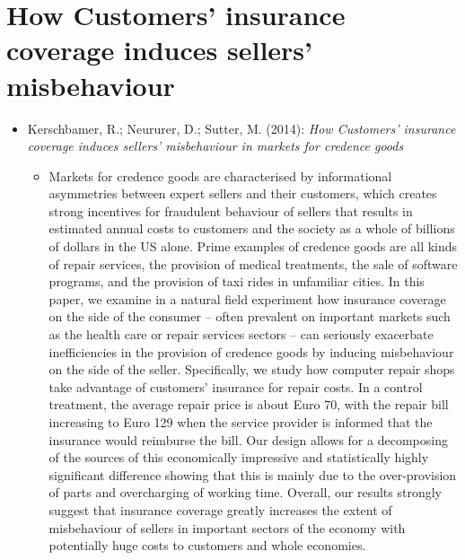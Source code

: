 \section{How Customers' insurance coverage induces sellers' misbehaviour}
\begin{itemize}	
	\item Kerschbamer, R.; Neururer, D.; Sutter, M. (2014): \textit{How Customers' insurance coverage induces sellers' misbehaviour in markets for credence goods}
		\begin{itemize}
			\item Markets for credence goods are characterised by informational asymmetries between expert sellers and their customers, which creates strong incentives for fraudulent behaviour of sellers that results in estimated annual costs to customers and the society as a whole of billions of dollars in the US alone. Prime examples of credence goods are all kinds of repair services, the provision of medical treatments, the sale of software programs, and the provision of taxi rides in unfamiliar cities. In this paper, we examine in a natural field experiment how insurance coverage on the side of the consumer – often prevalent on important markets such as the health care or repair services sectors – can seriously exacerbate inefficiencies in the provision of credence goods by inducing misbehaviour on the side of the seller. Specifically, we study how computer repair shops take advantage of customers’ insurance for repair costs. In a control treatment, the average repair price is about Euro 70, with the repair bill increasing to Euro 129 when the service provider is informed that the insurance would reimburse the bill. Our design allows for a decomposing of the sources of this economically impressive and statistically highly significant difference showing that this is mainly due to the over-provision of parts and overcharging of working time. Overall, our results strongly suggest that insurance coverage greatly increases the extent of misbehaviour of sellers in important sectors of the economy with potentially huge costs to customers and whole economies.
		\end{itemize}
\end{itemize}


\newpage